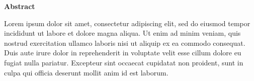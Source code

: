 \documentclass[document.tex]{subfiles}
\begin{document}
\begin{center}
        \textbf{{\fontsize{16pt}{18}\selectfont Abstract}}
        \vspace{1cm}
\end{center}

\noindent Lorem ipsum dolor sit amet, consectetur adipiscing elit, sed do eiusmod tempor incididunt ut labore et dolore magna aliqua. Ut enim ad minim veniam, quis nostrud exercitation ullamco laboris nisi ut aliquip ex ea commodo consequat. Duis aute irure dolor in reprehenderit in voluptate velit esse cillum dolore eu fugiat nulla pariatur. Excepteur sint occaecat cupidatat non proident, sunt in culpa qui officia deserunt mollit anim id est laborum.

\clearpage
\end{document}
